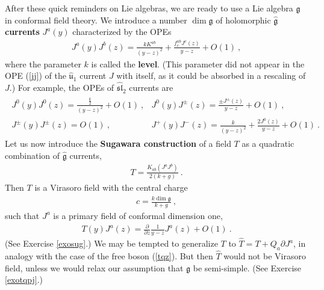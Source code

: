 \documentclass[12pt,a4paper,notitlepage]{report}
\newcommand \p {\partial}
\newcommand \pp[1] {{\frac{\p}{\p #1}}}
\numberwithin{equation}{section}
\theoremstyle{break}
\begin{document}
After these quick reminders on Lie algebras, we are ready to use a Lie algebra $\mathfrak{g}$ in conformal field theory. 
We introduce a number $\dim \mathfrak{g}$ of holomorphic \textbf{\boldmath $\hat{\mathfrak{g}}$ currents} $J^a(y)$ characterized by the OPEs 
\begin{align}
 \boxed{ J^a(y) J^b(z) = \frac{k K^{ab}}{(y-z)^2} +  \frac{ f^{ab}_c J^c(z)}{y-z}  + O(1)} \ ,
\label{jajb}
\end{align}
where the parameter $k$ is called the \textbf{level}. (This parameter did not appear in the OPE (\ref{jj}) of the $\hat{\mathfrak{u}}_1$ current $J$ with itself, as it could be absorbed in a rescaling of $J$.) For example, the OPEs of $\widehat{\mathfrak{sl}}_2$ currents are
\begin{align}
\begin{array}{ll}
  J^0(y)J^0(z) = \frac{\frac{k}{2}}{(y-z)^2} + O(1)\ ,  & J^0(y)J^\pm(z) = \frac{\pm J^\pm(z)}{y-z} + O(1)\ ,
\\
 J^\pm(y)J^\pm(z) = O(1) \ , & J^+(y)J^-(z) = \frac{k}{(y-z)^2} + \frac{2J^0(z)}{y-z} + O(1)\ .
\end{array}
\label{jjjj}
\end{align}
Let us now introduce the \textbf{\boldmath Sugawara construction} of a field $T$ as a quadratic combination of $\hat{\mathfrak{g}}$ currents,
\begin{align}
\boxed{ T =  \frac{ K_{ab} (J^aJ^b)}{2(k+g)} } \ .
\label{tjj} 
\end{align}
Then $T$ is a Virasoro field with the central charge 
\begin{align}
 \boxed{ c = \frac{ k \dim \mathfrak{g}}{k+g} }\ ,
\label{ckg}
\end{align}
such that $J^a$ is a primary field of conformal dimension one, 
\begin{align}
\boxed{ T(y)J^a(z) = \pp{z} \frac{1}{y-z} J^a(z) + O(1)} \ .
\label{tja}
\end{align}
(See Exercise \ref{exosug}.)
We may be tempted to generalize $T$ to $\hat{T} = T + Q_a\p J^a$, in analogy with the case of the free boson (\ref{tqz}). 
But then $\hat{T}$ would not be Virasoro field, unless we would relax our assumption that $\mathfrak{g}$ be semi-simple. (See Exercise \ref{exotqpj}.)
\end{document}
